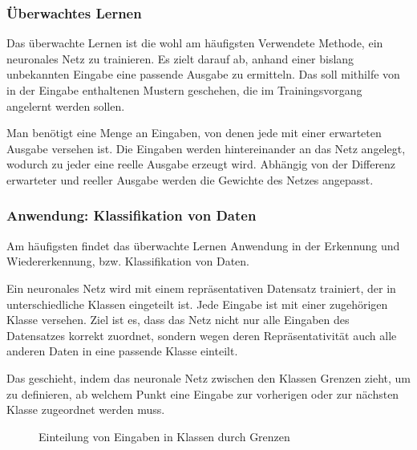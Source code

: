 \documentclass[12pt,a4]{article}
\begin{document}
\subsubsection{Überwachtes Lernen}
Das überwachte Lernen ist die wohl am häufigsten Verwendete Methode, ein neuronales Netz zu trainieren. Es zielt darauf ab, anhand einer bislang unbekannten Eingabe eine passende Ausgabe zu ermitteln. Das soll mithilfe von in der Eingabe enthaltenen Mustern geschehen, die im Trainingsvorgang angelernt werden sollen.

Man benötigt eine Menge an Eingaben, von denen jede mit einer erwarteten Ausgabe versehen ist. Die Eingaben werden hintereinander an das Netz angelegt, wodurch zu jeder eine reelle Ausgabe erzeugt wird. Abhängig von der Differenz erwarteter und reeller Ausgabe werden die Gewichte des Netzes angepasst.

\subsubsection*{Anwendung: Klassifikation von Daten}
Am häufigsten findet das überwachte Lernen Anwendung in der Erkennung und Wiedererkennung, bzw. Klassifikation von Daten.

Ein neuronales Netz wird mit einem repräsentativen Datensatz trainiert, der in unterschiedliche Klassen eingeteilt ist. Jede Eingabe ist mit einer zugehörigen Klasse versehen. Ziel ist es, dass das Netz nicht nur alle Eingaben des Datensatzes korrekt zuordnet, sondern wegen deren Repräsentativität auch alle anderen Daten in eine passende Klasse einteilt.

Das geschieht, indem das neuronale Netz zwischen den Klassen Grenzen zieht, um zu definieren, ab welchem Punkt eine Eingabe zur vorherigen oder zur nächsten Klasse zugeordnet werden muss.

\begin{figure}[!h]
\centering
{}
\caption{Einteilung von Eingaben in Klassen durch Grenzen}
\end{figure}
\end{document}
